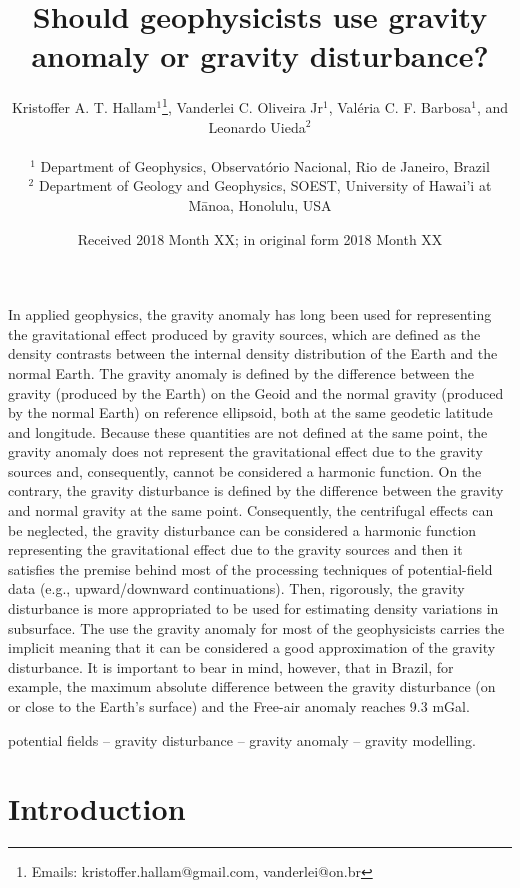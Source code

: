 \documentclass[extra]{gji}
\title[Gravity anomaly or gravity disturbance?]
      {Should geophysicists use gravity anomaly or gravity disturbance?}
\author[Hallam et al.]{
\parbox{\linewidth}{%
    Kristoffer A. T. Hallam$^{1}$\thanks{Emails: kristoffer.hallam@gmail.com, vanderlei@on.br},
    Vanderlei C. Oliveira Jr$^1$,
    Val\'{e}ria C. F. Barbosa$^1$, and \linebreak Leonardo Uieda$^2$
    \vspace{0.3cm}
}%
    \\
    $^1$ Department of Geophysics, Observat\'{o}rio Nacional, Rio de Janeiro, Brazil \\
    $^2$ Department of Geology and Geophysics, SOEST, University of Hawai'i at M\={a}noa, Honolulu, USA
}
\date{Received 2018 Month XX; in original form 2018 Month XX}
\begin{document}
\label{firstpage}

\maketitle


\begin{summary}
 In applied geophysics, the gravity anomaly has long been used for representing the
 gravitational effect produced by gravity sources, which are defined as the density
 contrasts between the internal density distribution of the Earth and the normal Earth.
 The gravity anomaly is defined by the difference between the gravity (produced by the
 Earth) on the Geoid and the normal gravity (produced by the normal Earth)
 on reference ellipsoid, both at the same geodetic latitude and longitude.
 Because these quantities are not defined at the same point,
 the gravity anomaly does not represent the gravitational effect due to the gravity
 sources and, consequently, cannot be considered a harmonic function.
 On the contrary, the gravity disturbance is defined by the difference between
 the gravity and normal gravity at the same point. Consequently, the centrifugal
 effects can be neglected, the gravity disturbance can be considered a harmonic
 function representing the gravitational effect due to the gravity sources and then
 it satisfies the premise behind most of the processing techniques of potential-field
 data (e.g., upward/downward continuations). Then, rigorously, the gravity disturbance
 is  more appropriated to be used for estimating density variations in subsurface.
 The use the gravity anomaly for most of the geophysicists carries the
 implicit meaning that it can be considered a good approximation of the gravity
 disturbance. It is important to bear in mind, however, that in Brazil, for example,
 the maximum absolute difference between the gravity disturbance (on or close
 to the Earth’s surface) and the Free-air anomaly reaches 9.3 mGal.

\end{summary}

\begin{keywords}
 potential fields -- gravity disturbance -- gravity anomaly -- gravity modelling.
\end{keywords}


\section{Introduction}
\end{document}
